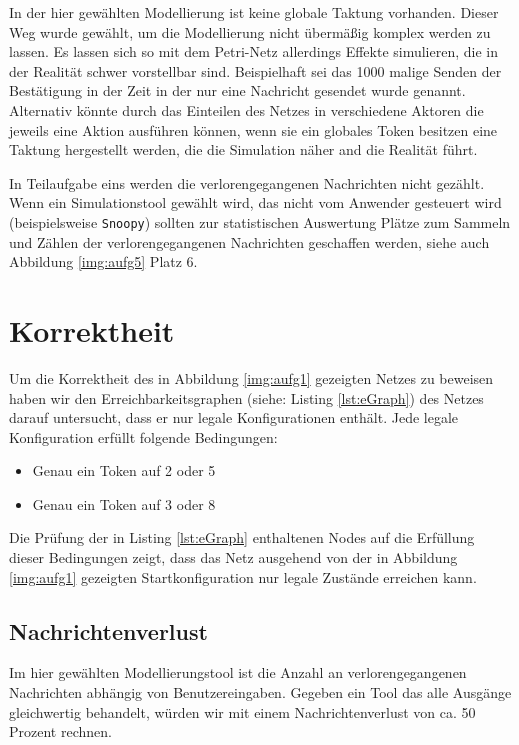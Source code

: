 \documentclass[10pt]{scrartcl}
\begin{document}
In der hier gewählten Modellierung ist keine globale Taktung vorhanden. Dieser Weg wurde gewählt, um die Modellierung nicht übermäßig komplex werden zu lassen. Es lassen sich so mit dem Petri-Netz allerdings Effekte simulieren, die in der Realität schwer vorstellbar sind. Beispielhaft sei das 1000 malige Senden der Bestätigung in der Zeit in der nur eine Nachricht gesendet wurde genannt. 
Alternativ könnte durch das Einteilen des Netzes in verschiedene Aktoren die jeweils eine Aktion ausführen können, wenn sie ein globales Token besitzen eine Taktung hergestellt werden, die die Simulation näher and die Realität führt. 

In Teilaufgabe eins werden die verlorengegangenen Nachrichten nicht gezählt. Wenn ein Simulationstool gewählt wird, das nicht vom Anwender gesteuert wird (beispielsweise \verb!Snoopy!) sollten zur statistischen Auswertung Plätze zum Sammeln und Zählen der verlorengegangenen Nachrichten geschaffen werden, siehe auch Abbildung \ref{img:aufg5} Platz 6. 
	
\section{Korrektheit}
Um die Korrektheit des in Abbildung \ref{img:aufg1} gezeigten Netzes zu beweisen haben wir den Erreichbarkeitsgraphen (siehe: Listing \ref{lst:eGraph}) des Netzes darauf untersucht, dass er nur legale Konfigurationen enthält.
Jede legale Konfiguration erfüllt folgende Bedingungen:
\begin{itemize}
	\item Genau ein Token auf 2 oder 5
	\item Genau ein Token auf 3 oder 8
\end{itemize}

Die Prüfung der in Listing \ref{lst:eGraph} enthaltenen Nodes auf die Erfüllung dieser Bedingungen zeigt, dass das Netz ausgehend von der in Abbildung \ref{img:aufg1} gezeigten Startkonfiguration nur legale Zustände erreichen kann.



\subsection{Nachrichtenverlust}
Im hier gewählten Modellierungstool ist die Anzahl an verlorengegangenen Nachrichten abhängig von Benutzereingaben. Gegeben ein Tool das alle Ausgänge gleichwertig behandelt, würden wir mit einem Nachrichtenverlust von ca. 50 Prozent rechnen.
\end{document}
